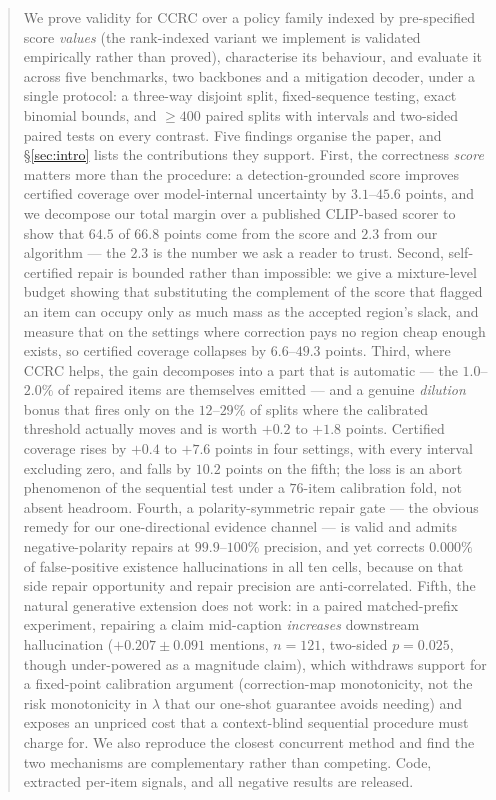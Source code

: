 \documentclass[review,number,doubleblind]{elsarticle}
\theoremstyle{plain}
\theoremstyle{definition}
\theoremstyle{remark}
\begin{document}
\begin{frontmatter}
\begin{abstract}
We prove validity for CCRC over a policy family indexed by pre-specified score \emph{values}
(the rank-indexed variant we implement is validated empirically rather than proved), characterise
its behaviour, and evaluate it across five
benchmarks, two backbones and a mitigation decoder, under a single protocol: a three-way
disjoint split, fixed-sequence testing, exact binomial bounds, and $\ge400$ paired splits
with intervals and two-sided paired tests on every contrast. Five findings organise the
paper, and \S\ref{sec:intro} lists the contributions they support.
First, the correctness \emph{score} matters more than the procedure: a detection-grounded
score improves certified coverage over model-internal uncertainty by $3.1$--$45.6$ points,
and we decompose our total margin over a published CLIP-based scorer to show that $64.5$ of
$66.8$ points come from the score and $2.3$ from our algorithm --- the $2.3$ is the number we
ask a reader to trust. Second, self-certified repair is bounded rather than impossible: we
give a mixture-level budget showing that substituting the complement of the score that
flagged an item can occupy only as much mass as the accepted region's slack, and measure
that on the settings where correction pays no region cheap enough exists, so certified
coverage collapses by $6.6$--$49.3$ points. Third, where CCRC helps, the gain decomposes into
a part that is automatic --- the $1.0$--$2.0\%$ of repaired items are themselves emitted --- and
a genuine \emph{dilution} bonus that fires only on the $12$--$29\%$ of splits where the
calibrated threshold actually moves and is worth $+0.2$ to $+1.8$ points. Certified coverage
rises by $+0.4$ to $+7.6$ points in four settings, with every interval excluding zero, and
falls by $10.2$ points on the fifth; the loss is an abort phenomenon of the sequential test
under a $76$-item calibration fold, not absent headroom. Fourth, a polarity-symmetric repair
gate --- the obvious remedy for our one-directional evidence channel --- is valid and admits
negative-polarity repairs at $99.9$--$100\%$ precision, and yet corrects $0.000\%$ of
false-positive existence hallucinations in all ten cells, because on that side repair
opportunity and repair precision are anti-correlated. Fifth, the natural generative extension
does not work: in a paired matched-prefix experiment, repairing a claim mid-caption
\emph{increases} downstream hallucination ($+0.207\pm0.091$ mentions, $n=121$, two-sided
$p=0.025$, though under-powered as a magnitude claim), which withdraws support for a
fixed-point calibration argument (correction-map monotonicity, not the risk monotonicity in
$\lambda$ that our one-shot guarantee avoids needing) and exposes an unpriced cost that a
context-blind sequential procedure must charge for. We also reproduce the closest concurrent
method and find the two mechanisms are complementary rather than competing. Code, extracted
per-item signals, and all negative results are released.
\end{abstract}


\end{frontmatter}
\end{document}
